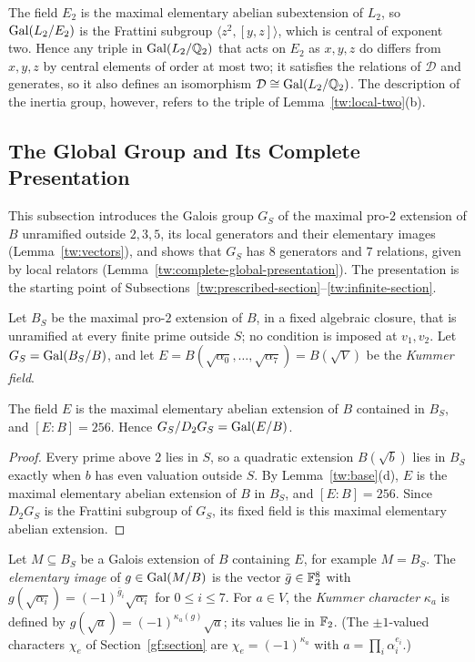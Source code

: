 \begin{remark}\label{tw:triple-remark}
The field $E_2$ is the maximal elementary abelian subextension of $L_2$, so
$\operatorname{Gal}(L_2/E_2)$ is the Frattini subgroup $\langle z^2,[y,z]\rangle$, which is
central of exponent two. Hence any triple in $\operatorname{Gal}(L_2/\mathbb Q_2)$ that acts on
$E_2$ as $x,y,z$ do differs from $x,y,z$ by central elements of order at
most two; it satisfies the relations of $\mathcal D$ and generates, so it also
defines an isomorphism $\mathcal D\cong\operatorname{Gal}(L_2/\mathbb Q_2)$. The description of the
inertia group, however, refers to the triple of
Lemma~\ref{tw:local-two}(b).
\end{remark}

\subsection{The Global Group and Its Complete Presentation}\label{tw:global-section}
This subsection introduces the Galois group $G_S$ of the maximal pro-$2$
extension of $B$ unramified outside $2,3,5$, its local generators and their
elementary images (Lemma~\ref{tw:vectors}), and shows that $G_S$ has $8$
generators and $7$ relations, given by local relators
(Lemma~\ref{tw:complete-global-presentation}). The presentation is the
starting point of Subsections~\ref{tw:prescribed-section}--\ref{tw:infinite-section}.

Let $B_S$ be the maximal pro-$2$ extension of $B$, in a fixed algebraic
closure, that is unramified at every finite prime outside $S$; no condition
is imposed at $v_1,v_2$. Let $G_S=\operatorname{Gal}(B_S/B)$, and let
$E=B(\sqrt{\alpha_0},\dots,\sqrt{\alpha_7})=B(\sqrt V)$ be the
\emph{Kummer field}.

\begin{lemma}\label{tw:kummer-field}
The field $E$ is the maximal elementary abelian extension of $B$ contained in
$B_S$, and $[E:B]=256$. Hence $G_S/D_2G_S=\operatorname{Gal}(E/B)$.
\end{lemma}

\begin{proof}
Every prime above $2$ lies in $S$, so a quadratic extension $B(\sqrt b)$ lies
in $B_S$ exactly when $b$ has even valuation outside $S$. By
Lemma~\ref{tw:base}(d), $E$ is the maximal elementary abelian extension of
$B$ in $B_S$, and $[E:B]=256$. Since $D_2G_S$ is the Frattini subgroup of
$G_S$, its fixed field is this maximal elementary abelian extension.
\end{proof}

\begin{definition}\label{tw:elementary-image}
Let $M\subseteq B_S$ be a Galois extension of $B$ containing $E$, for
example $M=B_S$. The \emph{elementary image} of $g\in\operatorname{Gal}(M/B)$ is the vector
$\bar g\in\mathbb F_2^8$ with $g(\sqrt{\alpha_i})=(-1)^{\bar g_i}\sqrt{\alpha_i}$ for
$0\le i\le7$. For $a\in V$, the \emph{Kummer character} $\kappa_a$ is defined by
$g(\sqrt a)=(-1)^{\kappa_a(g)}\sqrt a$; its values lie in $\mathbb F_2$. (The
$\pm1$-valued characters $\chi_e$ of Section~\ref{gf:section} are
$\chi_e=(-1)^{\kappa_{a}}$ with $a=\prod_i\alpha_i^{e_i}$.)
\end{definition}

